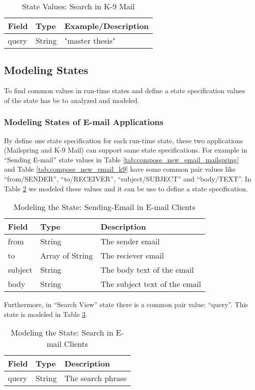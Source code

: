 \FloatBarrier \begin{table}[H]
\centering
\begin{tabular}{lll}
Field & Type   & Example/Description \\
\hline
query & String & "master thesis"    
\end{tabular}
\caption{State Values: Search in K-9 Mail}
\label{tab:search_k9}
\end{table} \FloatBarrier


\subsection{Modeling States}
To find common values in run-time states and define a state specification values of the state has be to analyzed and modeled.
\subsubsection{Modeling States of E-mail Applications}
 By define one state specification for each run-time state, these two applications (Mailspring and K-9 Mail) can support same state specifications. For example in “Sending E-mail” state values in Table \ref{tab:compose_new_email_mailspring} and Table \ref{tab:compose_new_email_k9} have some common pair values like “from/SENDER”, “to/RECEIVER”, “subject/SUBJECT” and “body/TEXT”. In Table \ref{tab:email-model} we modeled these values and it can be use to define a state specification. 


\FloatBarrier\FloatBarrier \begin{table}[H]
\centering
\begin{tabular}{lll}
Field   & Type   & Description                    \\ 
\hline
from    & String & The sender email               \\
to      & Array of String  & The reciever email             \\
subject & String & The body text of the email     \\
body    & String & The subject text of the email 
\end{tabular}
\caption{Modeling the State: Sending-Email in E-mail Clients}
\label{tab:email-model}
\end{table} \FloatBarrier


Furthermore, in “Search View” state there is a common pair value: “query”. This state is modeled in Table \ref{tab:search-model}.


\FloatBarrier
\begin{table}[H]
\centering
\begin{tabular}{lll}
Field & Type   & Description        \\ 
\hline
query & String & The search phrase 
\end{tabular}
\caption{Modeling the State: Search in E-mail Clients}
\label{tab:search-model}
\end{table}
\FloatBarrier